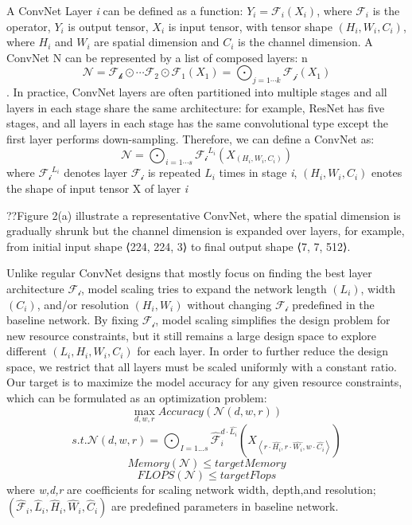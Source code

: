 \documentclass[
]{krantz}
\begin{document}
A ConvNet Layer \emph{i} can be defined as a function: \(Y_i = \mathcal{F}_i \left( X_i \right)\), where \(\mathcal{F}_i\) is the operator, \(Y_i\) is output tensor, \(X_i\) is input tensor, with tensor shape \(\left( H_i, W_i, C_i \right)\), where \(H_i\) and \(W_i\) are spatial dimension and \(C_i\) is the channel dimension. A ConvNet N can be represented by a list of composed layers: n \[ \mathcal{N}=\mathcal{F_k}\odot \cdots \mathcal{F_2}\odot\mathcal{F_1}\left( X_1 \right)=\bigodot_{j=1\cdots k}\mathcal{F_j}\left( X_1 \right)\]. In practice, ConvNet layers are often partitioned into multiple stages and all layers in each stage share the same architecture: for example, ResNet has five stages, and all layers in each stage has the same convolutional type except the first layer performs down-sampling. Therefore, we can define a ConvNet as:
\[\mathcal{N}=\bigodot_{i=1\cdots s}\mathcal{F_i}^{L_i}\left( X_{\left( H_i, W_i, C_i  \right)} \right)\]
where \(\mathcal{F_i}^{L_i}\) denotes layer \(\mathcal{F_i}\) is repeated \(L_i\) times in stage \emph{i}, \(\left( H_i, W_i, C_i \right)\) enotes the shape of input tensor X of layer \emph{i}

??Figure 2(a) illustrate a representative ConvNet, where the spatial dimension is gradually shrunk but the channel dimension is expanded over layers, for example, from initial input shape ⟨224, 224, 3⟩ to final output shape ⟨7, 7, 512⟩.

Unlike regular ConvNet designs that mostly focus on finding the best layer architecture \(\mathcal{F_i}\), model scaling tries to expand the network length \(\left( L_i\right)\), width \(\left( C_i \right)\), and/or resolution \(\left( H_i, W_i\right)\) without changing \(\mathcal{F_i}\) predefined in the baseline network. By fixing \(\mathcal{F_i}\), model scaling simplifies the design problem for new resource constraints, but it still remains a large design space to explore different \(\left( L_i, H_i, W_i, C_i \right)\) for each layer. In order to further reduce the design space, we restrict that all layers must be scaled uniformly with a constant ratio. Our target is to maximize the model accuracy for any given resource constraints, which can be formulated as an optimization problem:
\[ \max_{d,w,r}  Accuracy \left( \mathcal{N}\left( d,w,r \right) \right) \]
\[ s.t.\mathcal{N}\left( d,w,r \right)=\bigodot_{I=1...s}\hat{\mathcal{F}}_{i}^{d\cdot \hat{L_{i}}}\left( X_{\left\langle r\cdot \hat{H_i},r\cdot \hat{W_i},w\cdot \hat{C_i}\right\rangle} \right)\]
\[Memory\left( \mathcal{N} \right)≤ targetMemory\]
\[FLOPS\left( \mathcal{N} \right) ≤ targetFlops \]
where \emph{w,d,r} are coefficients for scaling network width, depth,and resolution; \(\left(\widehat{\mathcal{F}}_i, \widehat{L}_i, \widehat{H}_i, \widehat{W}_i, \widehat{C}_i \right)\) are predefined parameters in baseline network.
\end{document}
